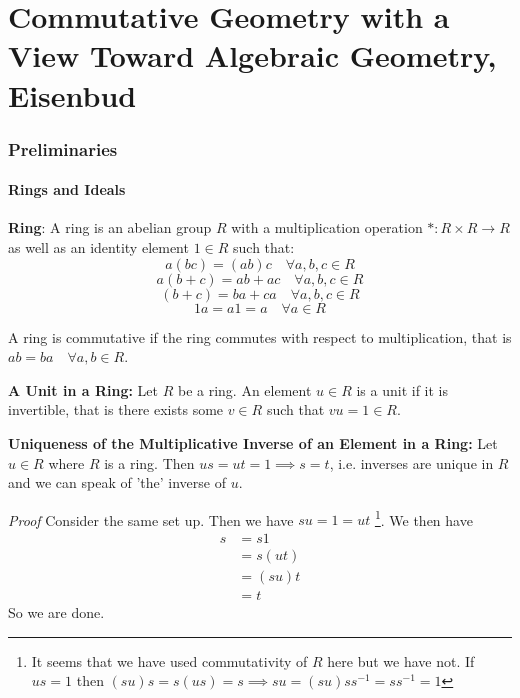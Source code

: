 \part{Commutative Geometry with a View Toward Algebraic Geometry, Eisenbud}

\section{Preliminaries}
\subsection{Rings and Ideals}
\begin{definition}
    \textbf{Ring}: A ring is an abelian group $R$ with a multiplication operation $*: R\times R\to R$ as well as an identity element $1\in R$ such that:
    \[a(bc) = (ab)c \quad \forall a,b,c\in R\]
    \[a(b + c) = ab + ac \quad \forall a,b,c \in R\]
    \[(b + c)  = ba + ca \quad \forall a,b,c\in R\]
    \[1a = a1 = a \quad \forall a\in R\]
\end{definition}
A ring is commutative if the ring commutes with respect to multiplication, that is $ab = ba \quad \forall a,b\in R$.

\begin{definition}
    \textbf{A Unit in a Ring: }Let $R$ be a ring. An element $u\in R$ is a unit if it is invertible, that is there exists some $v\in R$ such that $vu = 1 \in R$. 
\end{definition}

\begin{proposition}
    \textbf{Uniqueness of the Multiplicative Inverse of an Element in a Ring: }Let $u\in R$ where $R$ is a ring. Then $us = ut = 1\implies s = t$, i.e. inverses are unique in $R$ and we can speak of 'the' inverse of $u$.
\end{proposition}

\textit{Proof} Consider the same set up. Then we have $su = 1 = ut$ \footnote{It seems that we have used commutativity of $R$ here but we have not. If $us = 1$ then $(su)s = s(us) = s \implies su = (su)s s^{-1} = s s^{-1} = 1$}. We then have
\begin{equation*}
\begin{split}
    s &= s1 \\
    &= s (ut) \\
    &= (su) t \\
    &= t
\end{split}
\end{equation*}
So we are done.

